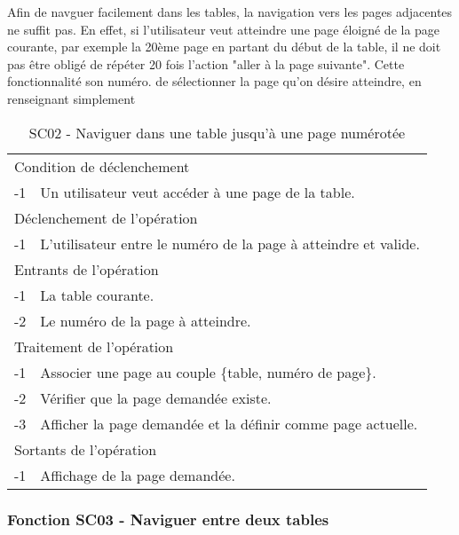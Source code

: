 \documentclass[a4paper]{article}
\begin{document}
Afin de navguer facilement dans les tables, la navigation vers les pages adjacentes ne suffit pas. En effet, si l'utilisateur veut atteindre une page éloigné de la page courante, par exemple la 20ème page en partant du début de la table, il  ne doit pas être obligé de répéter 20 fois l'action "aller à la page suivante". Cette fonctionnalité son numéro.  de sélectionner la page qu'on désire atteindre, en renseignant simplement
\begin{table}[H]
  \centering
   \small
	\begin{tabular}{|c|p{12cm}|}
   		\hline
   			\rowcolor{lightgray}\multicolumn{2}{|c|}{\textbf{SC02 - Naviguer dans une m\^eme table jusqu'à une page numérotée}} \\
   		\hline
   			\multicolumn{2}{|l|}{Condition de d\'eclenchement} \\
   		\hline
   		-1 & Un utilisateur veut acc\'eder \`a une page de la table. \\
   		\hline
   			\multicolumn{2}{|l|}{D\'eclenchement de l'op\'eration} \\
   		\hline
   			-1 & L'utilisateur entre le numéro de la page à atteindre et valide. \\
   		\hline
   			\multicolumn{2}{|l|}{Entrants de l'op\'eration} \\
   		\hline
   			-1 & La table courante. \\
        	-2 & Le numéro de la page à atteindre. \\ 
   		\hline
   			\multicolumn{2}{|l|}{Traitement de l'op\'eration} \\
  		\hline
   			-1 & Associer une page au couple \{table, numéro de page\}.  \\
        	-2 & V\'erifier que la page demand\'ee existe. \\
        	-3 & Afficher la page demand\'ee et la d\'efinir comme page actuelle. \\
   		\hline
   			\multicolumn{2}{|l|}{Sortants de l'op\'eration} \\
   		\hline
   			-1 & Affichage de la page demand\'ee. \\
   		\hline
	\end{tabular}
  \caption{SC02 - Naviguer dans une table jusqu'à une page numérotée}
  \normalsize
  \label{tab:naviguer_table_unique}
\end{table}


\subsubsection{Fonction SC03 - Naviguer entre deux tables}
\end{document}
